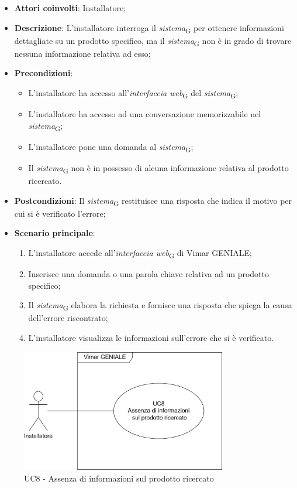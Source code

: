 \begin{itemize}
    \item \textbf{Attori coinvolti}: Installatore;
    \item \textbf{Descrizione}: L’installatore interroga il \textit{sistema}\textsubscript{G} per ottenere informazioni dettagliate su un prodotto specifico, ma il \textit{sistema}\textsubscript{G} non è in grado di trovare nessuna informazione relativa ad esso;
    \item \textbf{Precondizioni}: 
        \begin{itemize}
            \item L’installatore ha accesso all’\textit{interfaccia web}\textsubscript{G} del \textit{sistema}\textsubscript{G};
            \item L’installatore ha accesso ad una conversazione memorizzabile nel \textit{sistema}\textsubscript{G};
            \item L’installatore pone una domanda al \textit{sistema}\textsubscript{G};
            \item Il \textit{sistema}\textsubscript{G} non è in possesso di alcuna informazione relativa al prodotto ricercato.
        \end{itemize}
    \item \textbf{Postcondizioni}: Il \textit{sistema}\textsubscript{G} restituisce una risposta che indica il motivo per cui si è verificato l’errore;
    \item \textbf{Scenario principale}:
    \begin{enumerate}
    \item L’installatore accede all’\textit{interfaccia web}\textsubscript{G} di Vimar GENIALE;
    \item Inserisce una domanda o una parola chiave relativa ad un prodotto specifico;
    \item Il \textit{sistema}\textsubscript{G} elabora la richiesta e fornisce una risposta che spiega la causa dell'errore riscontrato;
    \item L’installatore visualizza le informazioni sull’errore che si è verificato.
    \end{enumerate}
\end{itemize}
\begin{figure}[H]
\centering
\includegraphics[width=0.8\textwidth]{contents/casi_duso/png/UC8.png}
\caption{UC8 - Assenza di informazioni sul prodotto ricercato}
\end{figure}


